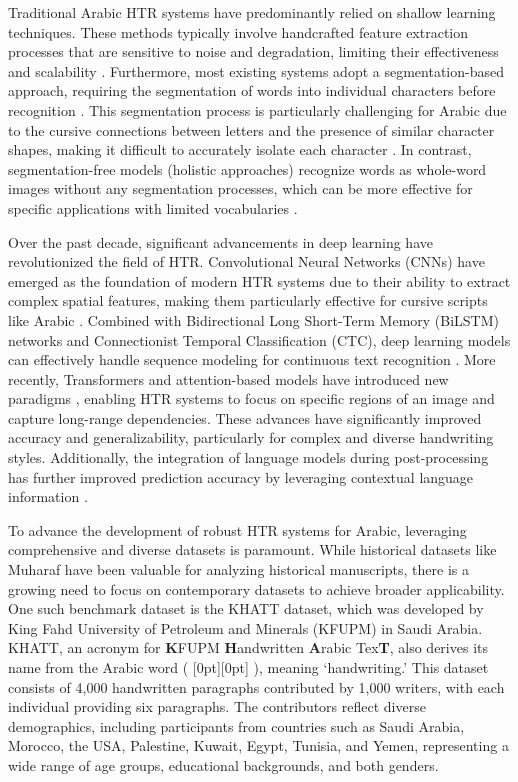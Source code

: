 \documentclass[conference]{IEEEtran}
\newcommand{\artext}[1]{%
  {\fontsize{8pt}{11pt}\selectfont \raisebox{0pt}[0pt][0pt]{\RL{#1}}}%
}
\begin{document}
Traditional Arabic HTR systems have predominantly relied on shallow learning techniques. These methods typically involve handcrafted feature extraction processes that are sensitive to noise and degradation, limiting their effectiveness and scalability \cite{parvez2013offline}. Furthermore, most existing systems adopt a segmentation-based approach, requiring the segmentation of words into individual characters before recognition \cite{faizullah2023survey}. This segmentation process is particularly challenging for Arabic due to the cursive connections between letters and the presence of similar character shapes, making it difficult to accurately isolate each character \cite{source5, source6}. In contrast, segmentation-free models (holistic approaches) recognize words as whole-word images without any segmentation processes, which can be more effective for specific applications with limited vocabularies \cite{source7, source8}.

Over the past decade, significant advancements in deep learning have revolutionized the field of HTR. Convolutional Neural Networks (CNNs) have emerged as the foundation of modern HTR systems due to their ability to extract complex spatial features, making them particularly effective for cursive scripts like Arabic \cite{mosbah2024adocrnet, alrobah2022arabic, altwaijry2021arabic}. Combined with Bidirectional Long Short-Term Memory (BiLSTM) networks and Connectionist Temporal Classification (CTC), deep learning models can effectively handle sequence modeling for continuous text recognition \cite{ahmad2020deep, aabed2024end, mosbah2024adocrnet,mutawa2024machine}. More recently, Transformers and attention-based models have introduced new paradigms \cite{wang2020decoupled, li2023trocr, bhunia2021metahtr}, enabling HTR systems to focus on specific regions of an image and capture long-range dependencies. These advances have significantly improved accuracy and generalizability, particularly for complex and diverse handwriting styles. Additionally, the integration of language models during post-processing has further improved prediction accuracy by leveraging contextual language information \cite{mutawa2024machine}.

To advance the development of robust HTR systems for Arabic, leveraging comprehensive and diverse datasets is paramount. While historical datasets like Muharaf \cite{saeed2024muharaf} have been valuable for analyzing historical manuscripts, there is a growing need to focus on contemporary datasets to achieve broader applicability. One such benchmark dataset is the KHATT dataset, which was developed by King Fahd University of Petroleum and Minerals (KFUPM) in Saudi Arabia. KHATT, an acronym for \textbf{K}FUPM \textbf{H}andwritten \textbf{A}rabic Tex\textbf{T}, also derives its name from the Arabic word (\artext{خط}), meaning ‘handwriting.’ This dataset consists of 4,000 handwritten paragraphs contributed by 1,000 writers, with each individual providing six paragraphs. The contributors reflect diverse demographics, including participants from countries such as Saudi Arabia, Morocco, the USA, Palestine, Kuwait, Egypt, Tunisia, and Yemen, representing a wide range of age groups, educational backgrounds, and both genders.
\end{document}
